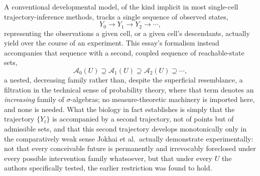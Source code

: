 \documentclass[11pt]{article}
\begin{document}
A conventional developmental model, of the kind implicit in most single-cell trajectory-inference methods, tracks a single sequence of observed states,
\begin{equation}
Y_0 \to Y_1 \to Y_2 \to \cdots,
\end{equation}
representing the observations a given cell, or a given cell's descendants, actually yield over the course of an experiment. This essay's formalism instead accompanies that sequence with a second, coupled sequence of reachable-state sets,
\begin{equation}
\mathcal{A}_0(U) \supseteq \mathcal{A}_1(U) \supseteq \mathcal{A}_2(U) \supseteq \cdots,
\end{equation}
a nested, decreasing family rather than, despite the superficial resemblance, a filtration in the technical sense of probability theory, where that term denotes an \emph{increasing} family of $\sigma$-algebras; no measure-theoretic machinery is imported here, and none is needed. What the biology in fact establishes is simply that the trajectory $\{Y_t\}$ is accompanied by a second trajectory, not of points but of admissible sets, and that this second trajectory develops monotonically only in the comparatively weak sense Jokhai et al.\ actually demonstrate experimentally: not that every conceivable future is permanently and irrevocably foreclosed under every possible intervention family whatsoever, but that under every $U$ the authors specifically tested, the earlier restriction was found to hold.
\end{document}
